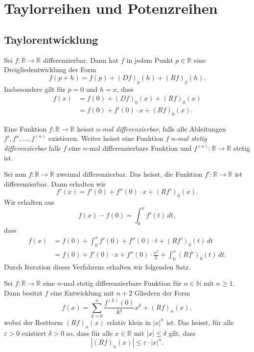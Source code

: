 \documentclass[../main.tex]{subfiles}
\begin{document}
\chapter{Taylorreihen und Potenzreihen}
\section{Taylorentwicklung}
Sei $f \colon \mathbb{R} \to \mathbb{R}$ differenzierbar.
Dann hat $f$ in  jedem Punkt $p \in \mathbb{R}$ eine Dreigliedentwicklung
der Form
\[
  f(p+ h) = f(p) + {(Df)}_p(h) + {(Rf)}_p(h).
\]
Insbesondere gilt für $p = 0$ und $h = x$, dass
\begin{align*}
  f(x) &= f(0) + {(Df)}_0(x) + {(Rf)}_0(x) \\
       &= f(0) + f'(0) \cdot x + {(Rf)}_0(x).
\end{align*}

\begin{definition}
  Eine Funktion $f \colon \mathbb{R} \to \mathbb{R}$ heisst $n$-\emph{mal
  differenzierbar}, falls alle Ableitungen $f', f'', \dots, f^{(n)}$ existieren.
  Weiter heisst eine Funktion $f$ 
  $n$-\emph{mal stetig differenzierbar} falls $f$ 
  eine $n$-mal differenzierbare Funktion und 
  $f^{(n)} \colon \mathbb{R} \to \mathbb{R}$ stetig ist.
\end{definition}


Sei nun $f \colon \mathbb{R} \to \mathbb{R}$ zweimal differenzierbar.
Das heisst, die Funktion $f' \colon \mathbb{R} \to \mathbb{R}$ ist differenzierbar.
Dann erhalten wir
\[
  f'(x) = f'(0) + f''(0) \cdot x + {(Rf')}_0 (x).
\]
Wir erhalten aus
\[
  f(x) - f(0)
   = \int_{0}^{x} f'(t) \, dt,
\]
dass
\begin{align*}
  f(x) 
  & = f(0) + \int_{0}^{x} f'(0) + f''(0) \cdot t + {(Rf')}_0(t) \, dt  \\
  & = f(0) + f'(0) \cdot x + f''(0) \cdot \frac{x^2}{2} + \int_{0}^{x} {(Rf')}_0(t) \, dt.
\end{align*}
Durch Iteration dieses Verfahrens erhalten wir folgenden Satz.

\newpage
\begin{theorem}\label{thm:taylor}
  Sei $f \colon \mathbb{R} \to \mathbb{R}$ eine
  $n$-mal stetig differenzierbare Funktion für $n \in \mathbb{N}$ mit $n \geq 1$.
  Dann besitzt $f$ eine Entwicklung
  mit $n + 2 $ Gliedern der Form
  \[
    f(x) = \sum_{k=0}^{n} \frac{f^{(k)}(0)}{k!}x^k + {(Rf)}_n(x),
  \]
  wobei der Restterm ${(Rf)}_n(x)$ relativ klein in
  $|x|^n$ ist. Das heisst, für alle $ \varepsilon > 0$
  existiert $\delta > 0$ so, dass für alle $x \in \mathbb{R}$ mit
  $|x| \leq \delta$ gilt, dass
  \[
    |{(Rf)}_n(x)| \leq \varepsilon \cdot |x|^n.
  \]
\end{theorem}
\end{document}
